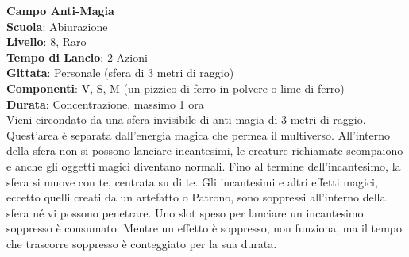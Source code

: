 \begin{multicols}{2}
\medskip\textbf{Campo Anti-Magia}\\
\textbf{Scuola}: Abiurazione\\
\textbf{Livello}: 8, Raro\\
\textbf{Tempo di Lancio}: 2 Azioni\\
\textbf{Gittata}: Personale (sfera di 3 metri di raggio)\\
\textbf{Componenti}: V, S, M (un pizzico di ferro in polvere o lime di ferro)\\
\textbf{Durata}: Concentrazione, massimo 1 ora\\
Vieni circondato da una sfera invisibile di anti-magia di 3 metri di raggio. Quest'area è separata dall'energia magica che permea il multiverso. All'interno della sfera non si possono lanciare incantesimi, le creature richiamate scompaiono e anche gli oggetti magici diventano normali. Fino al termine dell'incantesimo, la sfera si muove con te, centrata su di te. Gli incantesimi e altri effetti magici, eccetto quelli creati da un artefatto o Patrono, sono soppressi all'interno della sfera né vi possono penetrare. Uno slot speso per lanciare un incantesimo soppresso è consumato. Mentre un effetto è soppresso, non funziona, ma il tempo che trascorre soppresso è conteggiato per la sua durata.\\


\end{multicols}
